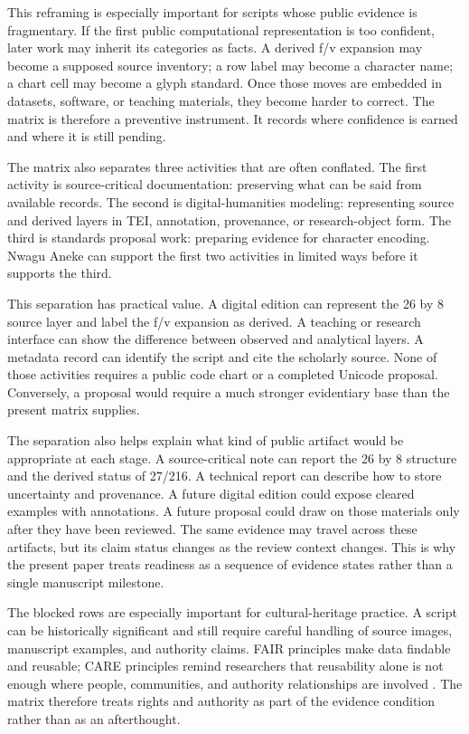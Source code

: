 \documentclass[sigconf,nonacm]{acmart}
\begin{document}
This reframing is especially important for scripts whose public evidence is
fragmentary. If the first public computational representation is too confident,
later work may inherit its categories as facts. A derived f/v expansion may
become a supposed source inventory; a row label may become a character name; a
chart cell may become a glyph standard. Once those moves are embedded in
datasets, software, or teaching materials, they become harder to correct. The
matrix is therefore a preventive instrument. It records where confidence is
earned and where it is still pending.

The matrix also separates three activities that are often conflated. The first
activity is source-critical documentation: preserving what can be said from
available records. The second is digital-humanities modeling: representing
source and derived layers in TEI, annotation, provenance, or research-object
form. The third is standards proposal work: preparing evidence for character
encoding. Nwagu Aneke can support the first two activities in limited ways
before it supports the third.

This separation has practical value. A digital edition can represent the 26 by
8 source layer and label the f/v expansion as derived. A teaching or research
interface can show the difference between observed and analytical layers. A
metadata record can identify the script and cite the scholarly source. None of
those activities requires a public code chart or a completed Unicode proposal.
Conversely, a proposal would require a much stronger evidentiary base than the
present matrix supplies.

The separation also helps explain what kind of public artifact would be
appropriate at each stage. A source-critical note can report the 26 by 8
structure and the derived status of 27/216. A technical report can describe how
to store uncertainty and provenance. A future digital edition could expose
cleared examples with annotations. A future proposal could draw on those
materials only after they have been reviewed. The same evidence may travel
across these artifacts, but its claim status changes as the review context
changes. This is why the present paper treats readiness as a sequence of
evidence states rather than a single manuscript milestone.

The blocked rows are especially important for cultural-heritage practice. A
script can be historically significant and still require careful handling of
source images, manuscript examples, and authority claims. FAIR principles make
data findable and reusable; CARE principles remind researchers that reusability
alone is not enough where people, communities, and authority relationships are
involved \cite{wilkinson2016fair,carroll2020care}. The matrix therefore treats
rights and authority as part of the evidence condition rather than as an
afterthought.
\end{document}
